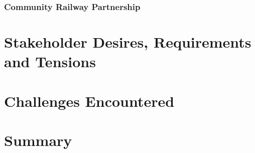 \subsubsection{Community Railway Partnership}

\section{Stakeholder Desires, Requirements and Tensions}

\section{Challenges Encountered}
\label{sec:OurPlaceChallenges}

\section{Summary}